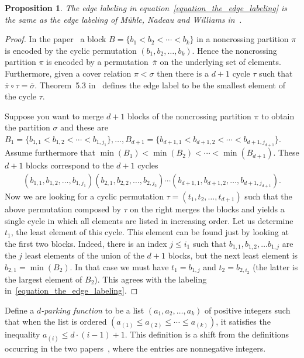\documentclass[11pt]{amsart}
\newtheorem{proposition}[theorem]{Proposition}
\numberwithin{equation}{section}
\begin{document}
\begin{proposition}
The edge labeling in equation~\eqref{equation_the_edge_labeling}
is the same as the edge labeling
of 
M\"uhle, Nadeau and Williams
in~\cite[Theorem~5.3]{Muhle_Nadeau_Williams}.
\end{proposition}
\begin{proof}
In the paper~\cite{Muhle_Nadeau_Williams}
a block $B = \{b_{1} < b_{2} < \cdots < b_{k}\}$
in a noncrossing partition $\pi$ is encoded by the
cyclic permutation
$(b_{1}, b_{2}, \ldots, b_{k})$.
Hence the noncrossing partition $\pi$ is encoded by a permutation~$\overline{\pi}$
on the underlying set of elements.
Furthermore, given a cover relation $\pi < \sigma$
then there is a $d+1$ cycle $\tau$ such that
$\overline{\pi} \circ \tau = \overline{\sigma}$.
Theorem~5.3 in~\cite{Muhle_Nadeau_Williams} defines the edge
label to be the smallest element of the cycle $\tau$.


Suppose you want to merge $d+1$ blocks of the noncrossing partition $\pi$
to obtain the partition $\sigma$
and these are 
$B_{1} = \{b_{1,1} < b_{1,2} < \cdots < b_{1,j_{1}}\},
\ldots,
B_{d+1} = \{b_{d+1,1} < b_{d+1,2} < \cdots < b_{d+1,j_{d+1}}\}$.
Assume furthermore that
$\min(B_{1}) < \min(B_{2}) < \cdots < \min(B_{d+1})$.
These $d+1$ blocks correspond to the $d+1$ cycles
\begin{align*}
(b_{1,1}, b_{1,2}, \ldots, b_{1,j_{1}})
(b_{2,1}, b_{2,2}, \ldots, b_{2,j_{2}})
\cdots
(b_{d+1,1},  b_{d+1,2}, \ldots, b_{d+1,j_{d+1}}) .
\end{align*}
Now we are looking for a cyclic permutation $\tau=(t_{1},t_{2},\ldots, t_{d+1})$
such that the above permutation composed by $\tau$ on the right
merges the blocks and
yields a single cycle in which all elements are listed in increasing order.
Let us determine $t_{1}$, the least element of this cycle.
This element can be found just by looking at the first two blocks.
Indeed, there is an index $j \leq i_{1}$ such that 
$b_{1,1}, b_{1,2}, \ldots b_{1,j}$ are the $j$ least elements of the union of the $d+1$ blocks,
but the next least element is $b_{2,1}=\min(B_2)$. In that case 
we must have $t_{1} = b_{1,j}$ and $t_{2}=b_{2,i_{2}}$ (the latter is the largest element of $B_2$).
This agrees with the labeling in~\eqref{equation_the_edge_labeling}.
\end{proof}


Define a {\em $d$-parking function} to be a list 
$(a_{1}, a_{2}, \ldots, a_{k})$
of positive integers such that
when the list is ordered
$(a_{(1)} \leq a_{(2)} \leq \cdots \leq a_{(k)})$,
it satisfies the inequality
$a_{(i)} \leq d \cdot (i-1) + 1$.
This definition is a shift from the definitions occurring in the two papers~\cite{Stanley_k-parking,Yan},
where the entries are nonnegative integers.
\end{document}
